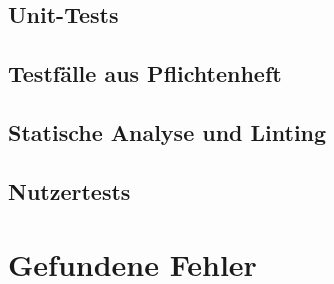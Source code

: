 \documentclass[parskip=full,11pt,twoside]{scrartcl}
\begin{document}
\subsection{Unit-Tests}



\subsection{Testfälle aus Pflichtenheft}

\subsection{Statische Analyse und Linting}



\subsection{Nutzertests}


\section{Gefundene Fehler}
\end{document}
